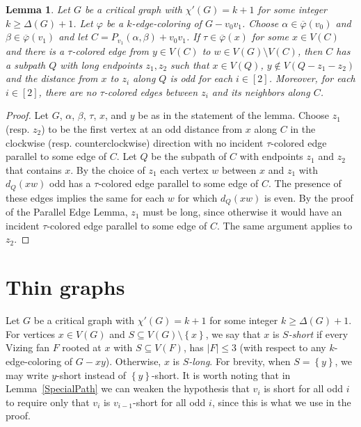 \documentclass[12pt]{amsart}
\theoremstyle{plain}
\newtheorem{lem}[thm]{Lemma}
\theoremstyle{definition}
\theoremstyle{remark}
\newcommand{\set}[1]{\left\{ #1 \right\}}
\newcommand{\irange}[1]{\left[#1\right]}
\newcommand{\vph}{\varphi}
\newcommand{\vphn}{\overline{\varphi}}
\begin{document}
\begin{lem}\label{TauEscape}
Let $G$ be a critical graph with $\chi'(G) = k+1$ for some integer $k \ge \Delta(G) + 1$.
Let $\vph$ be a $k$-edge-coloring of $G-v_0v_1$. Choose $\alpha \in \vphn(v_0)$
and $\beta \in \vphn(v_1)$ and let $C = P_{v_1}(\alpha, \beta) + v_0v_1$.  If
$\tau \in \vphn(x)$ for some $x \in V(C)$ and there is a $\tau$-colored edge
from $y \in V(C)$ to $w \in V(G) \setminus V(C)$, then $C$ has a subpath $Q$
with long endpoints $z_1,z_2$ such that $x \in V(Q)$, $y \not \in V(Q-z_1-z_2)$
and the distance from $x$ to $z_i$ along $Q$ is odd for each $i \in \irange{2}$. 
Moreover, for each $i \in \irange{2}$, there are no $\tau$-colored edges
between $z_i$ and its neighbors along $C$.
\end{lem}
\begin{proof}
Let $G$, $\alpha$, $\beta$, $\tau$, $x$, and $y$ be as in the statement of the
lemma.  Choose $z_1$ (resp. $z_2$) to be the first vertex at an odd distance
from $x$ along $C$ in the clockwise (resp. counterclockwise) direction with no
incident $\tau$-colored edge parallel to some edge of $C$.  
Let $Q$ be the subpath of $C$ with endpoints $z_1$ and $z_2$ that contains $x$.
By the choice of $z_1$ each vertex $w$ between $x$ and $z_1$ with $d_Q(xw)$ odd
has a $\tau$-colored edge parallel to some edge of $C$.  The presence of these
edges implies the same for each $w$ for which $d_Q(xw)$ is even.  By the proof
of the Parallel Edge Lemma, $z_1$ must be long, since otherwise it would have an
incident $\tau$-colored edge parallel to some edge of $C$.  The same argument
applies to $z_2$.
%
\end{proof}

\section{Thin graphs}
\label{sec:thin}
Let $G$ be a critical graph with $\chi'(G) = k+1$ for some integer $k \ge \Delta(G) + 1$.
For vertices $x \in V(G)$ and $S \subseteq V(G) \setminus \set{x}$, we say that $x$ is \emph{$S$-short} if 
every Vizing fan $F$ rooted at $x$ with $S \subseteq V(F)$, has $|F| \le 3$ (with respect to any $k$-edge-coloring of $G-xy$).
Otherwise, $x$ is \emph{$S$-long}.  For brevity, when $S = \set{y}$, we may write $y$-short instead of $\set{y}$-short.
It is worth noting that in Lemma~\ref{SpecialPath} we can weaken the hypothesis
that $v_i$ is short for all odd $i$ to require only that $v_i$ is
$v_{i-1}$-short for all odd $i$, since this is what we use in the proof.  
\end{document}
